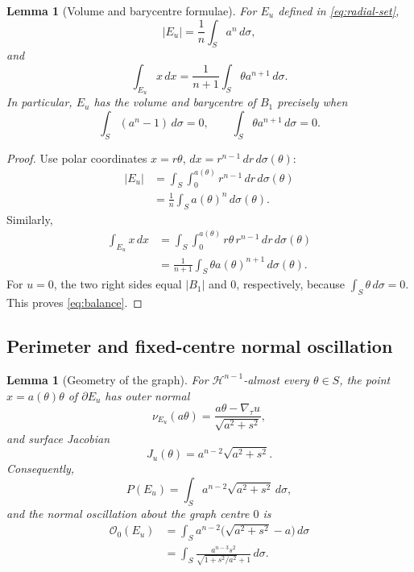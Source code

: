\documentclass[11pt]{amsart}
\newtheorem{lemma}[theorem]{Lemma}
\theoremstyle{definition}
\newcommand{\Hn}{\mathcal H^{n-1}}
\newcommand{\Per}{P}
\newcommand{\osc}{\mathcal O}
\begin{document}
\begin{lemma}[Volume and barycentre formulae]\label{lem:volume-bary}
For \(E_u\) defined in \eqref{eq:radial-set},
\[
   |E_u|=\frac1n\int_Sa^n\,d\sigma,
\tag{3.4}\label{eq:volume-graph}
\]
and
\[
   \int_{E_u}x\,dx=\frac1{n+1}\int_S\theta a^{n+1}\,d\sigma.
\tag{3.5}\label{eq:bary-graph}
\]
In particular, \(E_u\) has the volume and barycentre of \(B_1\) precisely when
\[
   \int_S(a^n-1)\,d\sigma=0,
   \qquad
   \int_S\theta a^{n+1}\,d\sigma=0.
\tag{3.6}\label{eq:balance}
\]
\end{lemma}

\begin{proof}
Use polar coordinates \(x=r\theta\), \(dx=r^{n-1}\,dr\,d\sigma(\theta)\):
\[
\begin{aligned}
   |E_u|
   &=\int_S\int_0^{a(\theta)}r^{n-1}\,dr\,d\sigma(\theta)  \\
   &=\frac1n\int_Sa(\theta)^n\,d\sigma(\theta).
\end{aligned}
\]
Similarly,
\[
\begin{aligned}
   \int_{E_u}x\,dx
   &=\int_S\int_0^{a(\theta)}r\theta\,r^{n-1}\,dr\,d\sigma(\theta) \\
   &=\frac1{n+1}\int_S\theta a(\theta)^{n+1}\,d\sigma(\theta).
\end{aligned}
\]
For \(u=0\), the two right sides equal \(|B_1|\) and \(0\), respectively,
because \(\int_S\theta\,d\sigma=0\).  This proves \eqref{eq:balance}.
\end{proof}

\subsection{Perimeter and fixed-centre normal oscillation}

\begin{lemma}[Geometry of the graph]\label{lem:graph-geometry}
For \(\Hn\)-almost every \(\theta\in S\), the point
\(x=a(\theta)\theta\) of \(\partial E_u\) has outer normal
\[
   \nu_{E_u}(a\theta)
   =\frac{a\theta-\nabla_\tau u}{\sqrt{a^2+s^2}},
\tag{3.7}\label{eq:graph-normal}
\]
and surface Jacobian
\[
   J_u(\theta)=a^{n-2}\sqrt{a^2+s^2}.
\tag{3.8}\label{eq:graph-jac}
\]
Consequently,
\[
   \Per(E_u)=\int_Sa^{n-2}\sqrt{a^2+s^2}\,d\sigma,
\tag{3.9}\label{eq:graph-perimeter}
\]
and the normal oscillation about the graph centre \(0\) is
\[
\begin{aligned}
   \osc_0(E_u)
   &=\int_Sa^{n-2}\bigl(\sqrt{a^2+s^2}-a\bigr)\,d\sigma \\
   &=\int_S
       \frac{a^{n-3}s^2}{\sqrt{1+s^2/a^2}+1}\,d\sigma.
\end{aligned}
\tag{3.10}\label{eq:graph-osc}
\]
\end{lemma}
\end{document}
